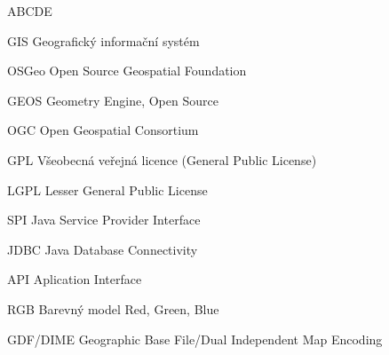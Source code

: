 
\begin{seznamzkratek}{ABCDE}

	      {GIS}
	      {Geografický informační systém}

	      {OSGeo}
	      {Open Source Geospatial Foundation}
      
	      {GEOS}
	      {Geometry Engine, Open Source}
	      
	      {OGC}
	      {Open Geospatial Consortium}
	      
	      
	      
	      {GPL}
	      {Všeobecná veřejná licence (General Public License)}
	      
	      {LGPL}
	      {Lesser General Public License}
	      
	      {SPI}
	      {Java Service Provider Interface}
	      
	      {JDBC}
	      {Java Database Connectivity}
	      
	      {API}
	      {Aplication Interface}
	      
	      {RGB}
	      {Barevný model Red, Green, Blue}

	      {GDF/DIME}
	      {Geographic Base File/Dual Independent Map Encoding}
	      
	      

\end{seznamzkratek}
